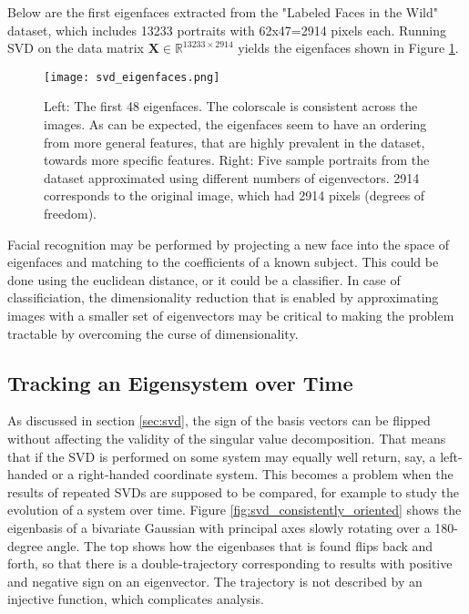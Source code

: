Below are the first eigenfaces extracted from the "Labeled Faces in the Wild" dataset, which includes 13233 portraits with 62x47=2914 pixels each. Running SVD on the data matrix $\mathbf{X} \in \mathbb{R}^{13233\times 2914}$ yields the eigenfaces shown in Figure \ref{fig:svd_eigenfaces}.

\begin{figure}
\centering
    \texttt{[image: svd\_eigenfaces.png]}
    \caption{Left: The first 48 eigenfaces. The colorscale is consistent across the images. As can be expected, the eigenfaces seem to have an ordering from more general features, that are highly prevalent in the dataset, towards more specific features. Right: Five sample portraits from the dataset approximated using different numbers of eigenvectors. 2914 corresponds to the original image, which had 2914 pixels (degrees of freedom).}
    \label{fig:svd_eigenfaces}
\end{figure}

Facial recognition may be performed by projecting a new face into the space of eigenfaces and matching to the coefficients of a known subject. This could be done using the euclidean distance, or it could be a classifier. In case of classificiation, the dimensionality reduction that is enabled by approximating images with a smaller set of eigenvectors may be critical to making the problem tractable by overcoming the curse of dimensionality.


\subsection{Tracking an Eigensystem over Time}
\label{sec:svd_tracking}
	
As discussed in section \ref{sec:svd}, the sign of the basis vectors can be flipped without affecting the validity of the singular value decomposition. That means that if the SVD is performed on some system may equally well return, say, a left-handed or a right-handed coordinate system. This becomes a problem when the results of repeated SVDs are supposed to be compared, for example to study the evolution of a system over time. Figure \ref{fig:svd_consistently_oriented} shows the eigenbasis of a bivariate Gaussian with principal axes slowly rotating over a 180-degree angle. The top shows how the eigenbases that is found flips back and forth, so that there is a double-trajectory corresponding to results with positive and negative sign on an eigenvector. The trajectory is not described by an injective function, which complicates analysis. 


